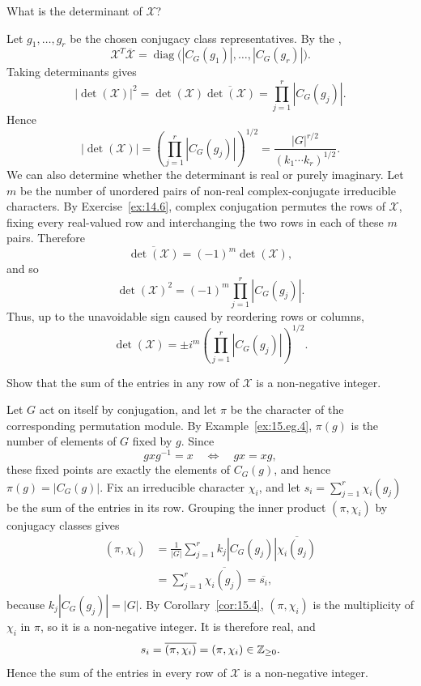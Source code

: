 \documentclass[../Odyssey_Project.tex]{subfiles}
\begin{document}
\begin{exercise}
\label{ex:15.1}
What is the determinant of $\mathcal{X}$?
\end{exercise}
\begin{solution}
    Let $g_1,\ldots,g_r$ be the chosen conjugacy class representatives. By the ,
    \[
        \mathcal{X}^{T}\overline{\mathcal{X}}
        =
        \operatorname{diag}\bigl(|C_G(g_1)|,\ldots,|C_G(g_r)|\bigr).
    \]
    Taking determinants gives
    \[
        |\det(\mathcal{X})|^2
        =
        \det(\mathcal{X})\overline{\det(\mathcal{X})}
        =
        \prod_{j=1}^{r}|C_G(g_j)|.
    \]
    Hence
    \[
        |\det(\mathcal{X})|
        =
        \left(\prod_{j=1}^{r}|C_G(g_j)|\right)^{1/2}
        =
        \frac{|G|^{r/2}}{(k_1\cdots k_r)^{1/2}}.
    \]
    We can also determine whether the determinant is real or purely imaginary. Let $m$ be the number of unordered pairs of non-real complex-conjugate irreducible characters. By Exercise~\ref{ex:14.6}, complex conjugation permutes the rows of $\mathcal{X}$, fixing every real-valued row and interchanging the two rows in each of these $m$ pairs. Therefore
    \[
        \overline{\det(\mathcal{X})}=(-1)^m\det(\mathcal{X}),
    \]
    and so
    \[
        \det(\mathcal{X})^2=(-1)^m\prod_{j=1}^{r}|C_G(g_j)|.
    \]
    Thus, up to the unavoidable sign caused by reordering rows or columns,
    \[
        \det(\mathcal{X})
        =
        \pm i^m\left(\prod_{j=1}^{r}|C_G(g_j)|\right)^{1/2}.
    \]
\end{solution}

\begin{exercise}
\label{ex:15.2}
Show that the sum of the entries in any row of $\mathcal{X}$ is a non-negative integer.
\end{exercise}
\begin{solution}
    Let $G$ act on itself by conjugation, and let $\pi$ be the character of the corresponding permutation module. By Example~\ref{ex:15.eg.4}, $\pi(g)$ is the number of elements of $G$ fixed by $g$. Since
    \[
        gxg^{-1}=x
        \quad\Longleftrightarrow\quad
        gx=xg,
    \]
    these fixed points are exactly the elements of $C_G(g)$, and hence $\pi(g)=|C_G(g)|$. Fix an irreducible character $\chi_i$, and let $s_i=\sum_{j=1}^{r}\chi_i(g_j)$ be the sum of the entries in its row. Grouping the inner product $(\pi,\chi_i)$ by conjugacy classes gives
    \begin{align*}
        (\pi,\chi_i)
        &=\frac{1}{|G|}\sum_{j=1}^{r}k_j|C_G(g_j)|\overline{\chi_i(g_j)} \\
        &=\sum_{j=1}^{r}\overline{\chi_i(g_j)}
        =\overline{s_i},
    \end{align*}
    because $k_j|C_G(g_j)|=|G|$. By Corollary~\ref{cor:15.4}, $(\pi,\chi_i)$ is the multiplicity of $\chi_i$ in $\pi$, so it is a non-negative integer. It is therefore real, and
    \[
        s_i=\overline{(\pi,\chi_i)}=(\pi,\chi_i)\in\mathbb{Z}_{\geq0}.
    \]
    Hence the sum of the entries in every row of $\mathcal{X}$ is a non-negative integer.
\end{solution}
\end{document}

